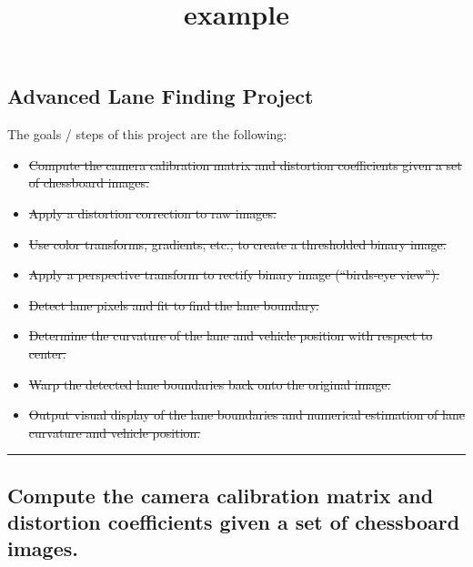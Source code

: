 \documentclass[11pt]{article}
\title{example}
\providecommand{\tightlist}{%
      \setlength{\itemsep}{0pt}\setlength{\parskip}{0pt}}
\begin{document}
    
    
    \maketitle
    
    

    
    \hypertarget{advanced-lane-finding-project}{%
\subsection{Advanced Lane Finding
Project}\label{advanced-lane-finding-project}}

The goals / steps of this project are the following:

\begin{itemize}
\tightlist
\item
  \sout{Compute the camera calibration matrix and distortion
  coefficients given a set of chessboard images.}
\item
  \sout{Apply a distortion correction to raw images.}
\item
  \sout{Use color transforms, gradients, etc., to create a thresholded
  binary image.}
\item
  \sout{Apply a perspective transform to rectify binary image
  (``birds-eye view'').}
\item
  \sout{Detect lane pixels and fit to find the lane boundary.}
\item
  \sout{Determine the curvature of the lane and vehicle position with
  respect to center.}
\item
  \sout{Warp the detected lane boundaries back onto the original image.}
\item
  \sout{Output visual display of the lane boundaries and numerical
  estimation of lane curvature and vehicle position.}
\end{itemize}

\begin{center}\rule{0.5\linewidth}{\linethickness}\end{center}

    \hypertarget{compute-the-camera-calibration-matrix-and-distortion-coefficients-given-a-set-of-chessboard-images.}{%
\subsection{Compute the camera calibration matrix and distortion
coefficients given a set of chessboard
images.}\label{compute-the-camera-calibration-matrix-and-distortion-coefficients-given-a-set-of-chessboard-images.}}
\end{document}
